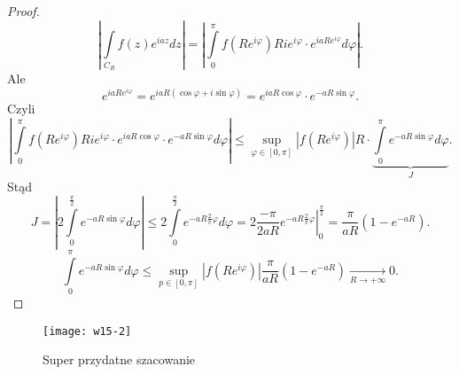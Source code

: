 \documentclass[../main.tex]{subfiles}
\begin{document}
\begin{proof}
    \[
        \left| \int\limits_{C_R} f(z)e^{iaz}dz\right| = \left| \int\limits_{0}^\pi f(Re^{i\varphi}) Rie^{i\varphi}\cdot e^{iaRe^{i\varphi}}d\varphi\right|
    .\]
Ale
\[
    e^{iaRe^{i\varphi}} = e^{iaR(\cos\varphi + i\sin\varphi)} = e^{iaR\cos\varphi} \cdot e^{-aR\sin\varphi}
.\]
Czyli
\[
    \left| \int\limits_{0}^\pi f(Re^{i\varphi})Rie^{i\varphi}\cdot e^{iaR\cos\varphi}\cdot e^{-aR\sin\varphi}d\varphi \right| \le \underset{\varphi\in[0,\pi]}{\sup}\left| f(Re^{i\varphi}) \right| R\cdot \underbrace{\int\limits_{0}^{\pi}e^{-aR\sin\varphi}d\varphi}_{J}
.\]
Stąd
\[
    J = \left| 2\int\limits_{0}^{\frac{\pi}{2}}e^{-aR\sin\varphi}d\varphi \right| \le 2\int\limits_{0}^{\frac{\pi}{2}}e^{-aR \frac{2}{\pi}\varphi}d\varphi = 2 \left.\frac{-\pi}{2aR}e^{-aR \frac{2}{\pi}\varphi}\right|_0^{\frac{\pi}{2}} = \frac{\pi}{aR}\left( 1 - e^{-aR} \right)
.\]
\[
    \int\limits_{0}^{\pi}e^{-aR\sin\varphi}d\varphi \le \underset{p\in[0,\pi]}{\sup} \left| f(Re^{i\varphi}) \right| \frac{\pi}{aR}\left( 1-e^{-aR} \right) \underset{R\to +\infty}{\longrightarrow} 0
.\]
\end{proof}
\begin{figure}[h]
    \centering
    \texttt{[image: w15-2]}
    \caption{Super przydatne szacowanie}
    \label{fig:w15-2}
\end{figure}
\end{document}
